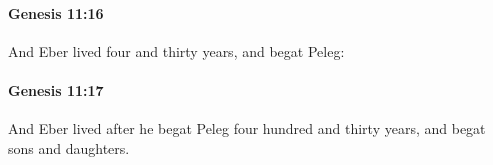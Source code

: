 		\paragraph{Genesis 11:16} %
			\label{GENESIS-11-16}

			And Eber lived four and thirty years, and begat Peleg:


		\paragraph{Genesis 11:17} %
			\label{GENESIS-11-17}

			And Eber lived after he begat Peleg four hundred and thirty years, and begat sons and daughters.


